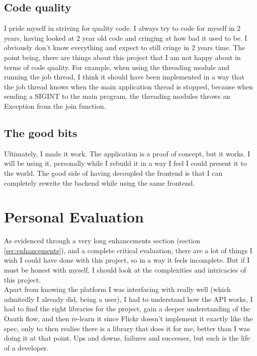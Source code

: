 \documentclass[10pt, a4paper]{article}
\begin{document}
        \subsection{Code quality}
        I pride myself in striving for quality code. I always try to code for myself in 2 years, having looked at 2 year old code and cringing at how bad it used to be. I obviously don't know everything and expect to still cringe in 2 years time. The point being, there are things about this project that I am not happy about in terms of code quality. For example, when using the threading module and running the job thread, I think it should have been implemented in a way that the job thread knows when the main application thread is stopped, because when sending a SIGINT to the main program, the threading modules throws an Exception from the join function.

        \subsection{The good bits}
        Ultimately, I made it work. The application is a proof of concept, but it works. I will be using it, personally while I rebuild it in a way I feel I could present it to the world.
        The good side of having decoupled the frontend is that I can completely rewrite the backend while using the same frontend.

        \section{Personal Evaluation}
        As evidenced through a very long enhancements section (section \ref{sec:enhancements}), and a complete critical evaluation, there are a lot of things I wish I could have done with this project, so in a way it feels incomplete.
        But if I must be honest with myself, I should look at the complexities and intricacies of this project.\\
        Apart from knowing the platform I was interfacing with really well (which admitedly I already did, being a user), I had to understand how the API works, I had to find the right libraries for the project, gain a deeper understanding of the Oauth flow, and then re-learn it since Flickr doesn't implement it exactly like the spec, only to then realise there is a library that does it for me, better than I was doing it at that point. Ups and downs, failures and successes, but such is the life of a developer.
\end{document}
